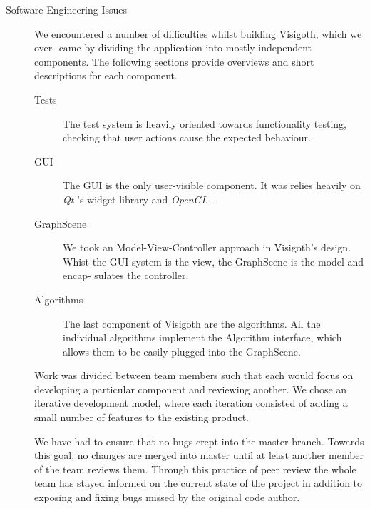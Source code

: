 \documentclass[a4paper,11pt]{article}
\newcommand{\buzz}[1]{\emph{#1}}
\newcommand{\Qt}{\buzz{Qt} }
\newcommand{\OpenGL}{\buzz{OpenGL} }
\begin{document}
\begin{description}
\item[Software Engineering Issues]

  We encountered a number of difficulties whilst building Visigoth,
  which we over- came by dividing the application into
  mostly-independent components.  The following sections provide
  overviews and short descriptions for each component.

  \begin{description}
  \item[Tests] The test system is heavily oriented towards
    functionality testing, checking that user actions cause the
    expected behaviour.

  \item[GUI] The GUI is the only user-visible component. It was relies
    heavily on \Qt's widget library and \OpenGL.

  \item[GraphScene] We took an Model-View-Controller approach in
    Visigoth's design. Whist the GUI system is the view, the
    GraphScene is the model and encap- sulates the controller.

  \item[Algorithms] The last component of Visigoth are the
    algorithms. All the individual algorithms implement the Algorithm
    interface, which allows them to be easily plugged into the
    GraphScene.
  \end{description}

  Work was divided between team members such that each would focus on
  developing a particular component and reviewing another. We chose an
  iterative development model, where each iteration consisted of
  adding a small number of features to the existing product.

  We have had to ensure that no bugs crept into the master
  branch. Towards this goal, no changes are merged into master until
  at least another member of the team reviews them. Through this
  practice of peer review the whole team has stayed informed on the
  current state of the project in addition to exposing and fixing bugs
  missed by the original code author.


\end{description}
\end{document}
